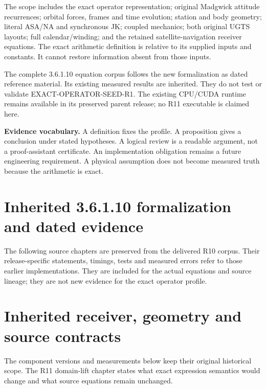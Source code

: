 The scope includes the exact operator representation; original Madgwick attitude
recurrences; orbital forces, frames and time evolution; station and body geometry;
literal ASA/NA and synchronous JK; coupled mechanics; both original UGTS layouts;
full calendar/winding; and the retained satellite-navigation receiver equations.
The exact arithmetic definition is relative to its supplied inputs and constants.
It cannot restore information absent from those inputs.

The complete 3.6.1.10 equation corpus follows the new formalization as dated
reference material. Its existing measured results are inherited. They do not
test or validate EXACT-OPERATOR-SEED-R1. The existing CPU/CUDA runtime remains
available in its preserved parent release; no R11 executable is claimed here.

\begin{panel}
\textbf{Evidence vocabulary.} A definition fixes the profile. A proposition gives
a conclusion under stated hypotheses. A logical review is a readable argument,
not a proof-assistant certificate. An implementation obligation remains a future
engineering requirement. A physical assumption does not become measured truth
because the arithmetic is exact.
\end{panel}
\tableofcontents\clearpage






\clearpage
\section*{Inherited 3.6.1.10 formalization and dated evidence}
\fancyhead[R]{\sffamily\small\textcolor{muted}{INHERITED R10 / DATED EVIDENCE}}
The following source chapters are preserved from the delivered R10 corpus.
Their release-specific statements, timings, tests and measured errors refer to
those earlier implementations. They are included for the actual equations and
source lineage; they are not new evidence for the exact operator profile.




\section*{Inherited receiver, geometry and source contracts}
The component versions and measurements below keep their original historical
scope. The R11 domain-lift chapter states what exact expression semantics would
change and what source equations remain unchanged.


